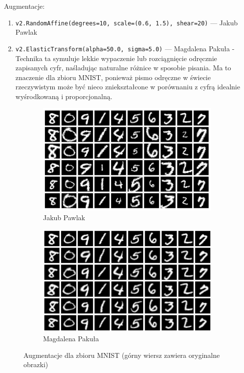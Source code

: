 \documentclass[10pt]{article}
\begin{document}
Augmentacje:
\begin{enumerate}
    \item \texttt{v2.RandomAffine(degrees=10, scale=(0.6, 1.5), shear=20)} --- Jakub Pawlak
    \item \texttt{v2.ElasticTransform(alpha=50.0, sigma=5.0)} --- Magdalena Pakuła -
          Technika ta symuluje lekkie wypaczenie lub rozciągnięcie odręcznie zapisanych cyfr, naśladując naturalne różnice w sposobie pisania.
          Ma to znaczenie dla zbioru MNIST, ponieważ pismo odręczne w świecie rzeczywistym może być nieco zniekształcone w porównaniu z cyfrą idealnie wyśrodkowaną i proporcjonalną.
\end{enumerate}

\begin{figure}[H]\centering
    \begin{subfigure}[t]{.45\textwidth}
        \centering
        \includegraphics[width=.7\linewidth]{img/kuba/mnist/augmentations.png}
        \caption{Jakub Pawlak}
    \end{subfigure}
    \begin{subfigure}[t]{.45\textwidth}
        \centering
        \includegraphics[width=.7\linewidth]{img/magda/augmented_MNIST}
        \caption{Magdalena Pakuła}
    \end{subfigure}
    \caption{Augmentacje dla zbioru MNIST (górny wiersz zawiera oryginalne obrazki)}
\end{figure}
\end{document}
